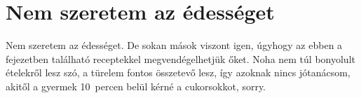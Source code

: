 \chapter*{Nem szeretem az édességet} \label{ch:nem_szeretem_az_edesseget}

Nem szeretem az édességet. De sokan mások viszont igen, úgyhogy az ebben a fejezetben található receptekkel megvendégelhetjük őket. Noha nem túl bonyolult ételekről lesz szó, a türelem fontos összetevő lesz, így azoknak nincs jótanácsom, akitől a gyermek \num{10}~percen belül kérné a cukorsokkot, sorry.





